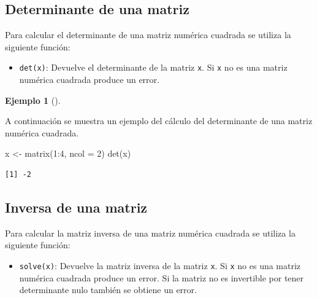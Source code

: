 \documentclass[
  a4paper,
]{scrreport}
\newenvironment{Shaded}{\begin{snugshade}}{\end{snugshade}}
\newcommand{\AttributeTok}[1]{\textcolor[rgb]{0.40,0.45,0.13}{#1}}
\newcommand{\DecValTok}[1]{\textcolor[rgb]{0.68,0.00,0.00}{#1}}
\newcommand{\FunctionTok}[1]{\textcolor[rgb]{0.28,0.35,0.67}{#1}}
\newcommand{\NormalTok}[1]{\textcolor[rgb]{0.00,0.23,0.31}{#1}}
\newcommand{\OtherTok}[1]{\textcolor[rgb]{0.00,0.23,0.31}{#1}}
\newcommand{\SpecialCharTok}[1]{\textcolor[rgb]{0.37,0.37,0.37}{#1}}
\providecommand{\tightlist}{%
  \setlength{\itemsep}{0pt}\setlength{\parskip}{0pt}}\usepackage{longtable,booktabs,array}
\theoremstyle{definition}
\theoremstyle{definition}
\newtheorem{example}{Ejemplo}[chapter]
\theoremstyle{remark}
\begin{document}
\hypertarget{determinante-de-una-matriz}{%
\subsection{Determinante de una
matriz}\label{determinante-de-una-matriz}}

Para calcular el determinante de una matriz numérica cuadrada se utiliza
la siguiente función:

\begin{itemize}
\tightlist
\item
  \texttt{det(x)}: Devuelve el determinante de la matriz \texttt{x}. Si
  \texttt{x} no es una matriz numérica cuadrada produce un error.
\end{itemize}

\leavevmode{}%
\begin{example}[]\label{exm-determinante}

A continuación se muestra un ejemplo del cálculo del determinante de una
matriz numérica cuadrada.

\begin{Shaded}
\begin{Highlighting}[]
\NormalTok{x }\OtherTok{\textless{}{-}} \FunctionTok{matrix}\NormalTok{(}\DecValTok{1}\SpecialCharTok{:}\DecValTok{4}\NormalTok{, }\AttributeTok{ncol =} \DecValTok{2}\NormalTok{)}
\FunctionTok{det}\NormalTok{(x)}
\end{Highlighting}
\end{Shaded}

\begin{verbatim}
[1] -2
\end{verbatim}

\end{example}

\hypertarget{inversa-de-una-matriz}{%
\subsection{Inversa de una matriz}\label{inversa-de-una-matriz}}

Para calcular la matriz inversa de una matriz numérica cuadrada se
utiliza la siguiente función:

\begin{itemize}
\tightlist
\item
  \texttt{solve(x)}: Devuelve la matriz inversa de la matriz \texttt{x}.
  Si \texttt{x} no es una matriz numérica cuadrada produce un error. Si
  la matriz no es invertible por tener determinante nulo también se
  obtiene un error.
\end{itemize}
\end{document}
